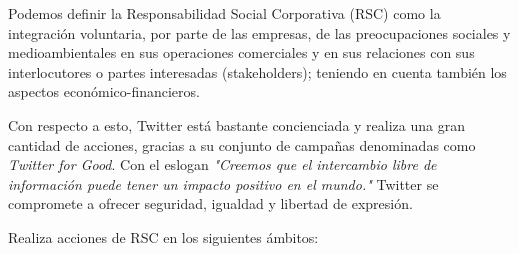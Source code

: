 Podemos definir la Responsabilidad Social Corporativa (RSC) como la integración voluntaria, por parte de las empresas, de las preocupaciones sociales y medioambientales en sus operaciones comerciales y en sus relaciones con sus interlocutores o partes interesadas (stakeholders); teniendo en cuenta también los aspectos económico-financieros. 

Con respecto a esto, Twitter está bastante concienciada y realiza una gran cantidad de acciones, gracias a su conjunto de campañas denominadas como \textit{Twitter for Good}. Con el eslogan \textit{"Creemos que el intercambio libre de información puede tener un impacto positivo en el mundo."} Twitter se compromete a ofrecer seguridad, igualdad y libertad de expresión.

Realiza acciones de RSC en los siguientes ámbitos:

